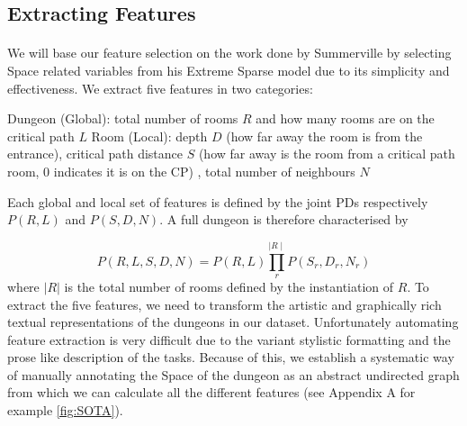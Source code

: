 \documentclass{UoYCSproject}
\begin{document}
\subsection{Extracting Features}
\label{subsec:feature_extraction}
\paragraph{}
We will base our feature selection on the work done by Summerville \parencite{SummervilleSamplingHyrule} by selecting Space related variables from his Extreme Sparse model due to its simplicity and effectiveness. We extract five features in two categories: 
\begin{outline}[enumerate]
  \1 Dungeon (Global): total number of rooms \(R\) and how many rooms are on the critical path \(L\)
  \1 Room (Local): depth \(D\) (how far away the room is from the entrance), critical path distance \(S\) (how far away is the room from a critical path room, 0 indicates it is on the CP) , total number of neighbours \(N\)
\end{outline}
Each global and local set of features is defined by the joint PDs respectively \(P(R, L)\) and \(P(S, D, N)\). A full dungeon is therefore characterised by 

\begin{equation}
  \label{eq:full_joint_PD}
  P(R,L,S,D,N) = P(R, L) \prod_{r}^{\mid R \mid} P(S_r, D_r, N_r)
\end{equation}
where \(|R|\) is the total number of rooms defined by the instantiation of \(R\). To extract the five features, we need to transform the artistic and graphically rich textual representations of the dungeons in our dataset. Unfortunately automating feature extraction is very difficult due to the variant stylistic formatting and the prose like description of the tasks. Because of this, we establish a systematic way of manually annotating the Space of the dungeon as an abstract undirected graph from which we can calculate all the different features (see Appendix A for example \ref{fig:SOTA}).
\end{document}
